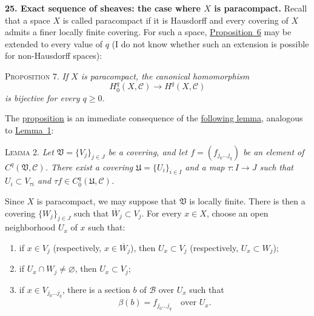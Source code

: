 
\medskip
{}\label{fac:I:3:no:25}
\textbf{25. Exact sequence of sheaves: the case where $X$ is paracompact.}
Recall that a space $X$ is called paracompact if it is Hausdorff and every covering of $X$ admits a finer locally finite covering. For such a space, \hyperref[fac:I:3:no:24:prop:6]{Proposition~6} may be extended to every value of $q$ (I do not know whether such an extension is possible for non-Hausdorff spaces):

\label{fac:I:3:no:25:prop:7}
\textsc{Proposition 7.} \textit{If $X$ is paracompact, the canonical homomorphism}
\[
H_0^q(X,\mathcal{C})\longrightarrow H^q(X,\mathcal{C})
\]
\textit{is bijective for every $q\geq0$.}

The \hyperref[fac:I:3:no:25:prop:7]{proposition} is an immediate consequence of the \hyperref[fac:I:3:no:25:lemma:2]{following lemma}, analogous to \hyperref[fac:I:3:no:24:lemma:1]{Lemma~1}:

\label{fac:I:3:no:25:lemma:2}
\textsc{Lemma 2.} \textit{Let $\mathfrak{V}=\{V_j\}_{j\in J}$ be a covering, and let
$f=(f_{j_0\ldots j_q})$ be an element of $C^q(\mathfrak{V},\mathcal{C})$. There exist a covering
$\mathfrak{U}=\{U_i\}_{i\in I}$ and a map $\tau:I\to J$ such that $U_i\subset V_{\tau i}$ and
$\tau f\in C_0^q(\mathfrak{U},\mathcal{C})$.}

Since $X$ is paracompact, we may suppose that $\mathfrak{V}$ is locally finite. There is then a covering $\{W_j\}_{j\in J}$ such that $\overline{W}_j\subset V_j$. For every $x\in X$, choose an open neighborhood $U_x$ of $x$ such that:

\begin{enumerate}[label=(\alph*),leftmargin=2.5em]
\item\label{fac:I:3:no:25:lemma:2:item:a} if $x\in V_j$ (respectively, $x\in\overline{W}_j$), then $U_x\subset V_j$ (respectively, $U_x\subset W_j$);
\item\label{fac:I:3:no:25:lemma:2:item:b} if $U_x\cap W_j\neq\varnothing$, then $U_x\subset V_j$;
\item\label{fac:I:3:no:25:lemma:2:item:c} if $x\in V_{j_0\ldots j_q}$, there is a section $b$ of $\mathcal{B}$ over $U_x$ such that
\[
\beta(b)=f_{j_0\ldots j_q}\quad\text{over }U_x.
\]
\end{enumerate}

